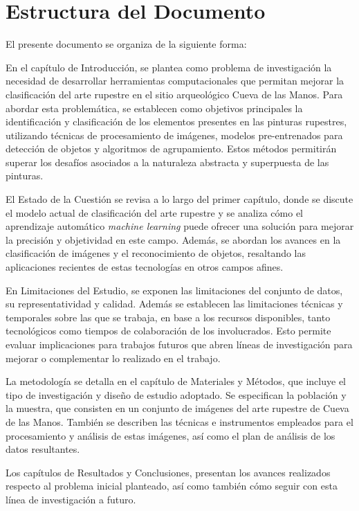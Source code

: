 \section{Estructura del Documento}

El presente documento se organiza de la siguiente forma:

En el capítulo de Introducción, se plantea como problema de investigación la necesidad de desarrollar herramientas computacionales que permitan mejorar la clasificación del arte rupestre en el sitio arqueológico Cueva de las Manos. Para abordar esta problemática, se establecen como objetivos principales la identificación y clasificación de los elementos presentes en las pinturas rupestres, utilizando técnicas de procesamiento de imágenes, modelos pre-entrenados para detección de objetos y algoritmos de agrupamiento. Estos métodos permitirán superar los desafíos asociados a la naturaleza abstracta y superpuesta de las pinturas.

El Estado de la Cuestión se revisa a lo largo del primer capítulo, donde se discute el modelo actual de clasificación del arte rupestre y se analiza cómo el aprendizaje automático \textit{machine learning} puede ofrecer una solución para mejorar la precisión y objetividad en este campo. Además, se abordan los avances en la clasificación de imágenes y el reconocimiento de objetos, resaltando las aplicaciones recientes de estas tecnologías en otros campos afines.

En Limitaciones del Estudio, se exponen las limitaciones del conjunto de datos, su representatividad y calidad. Además se establecen las limitaciones técnicas y temporales sobre las que se trabaja, en base a los recursos disponibles, tanto tecnológicos como tiempos de colaboración de los involucrados. Esto permite evaluar implicaciones para trabajos futuros que abren líneas de investigación para mejorar o complementar lo realizado en el trabajo.

La metodología se detalla en el capítulo de Materiales y Métodos, que incluye el tipo de investigación y diseño de estudio adoptado. Se especifican la población y la muestra, que consisten en un conjunto de imágenes del arte rupestre de Cueva de las Manos. También se describen las técnicas e instrumentos empleados para el procesamiento y análisis de estas imágenes, así como el plan de análisis de los datos resultantes.

Los capítulos de Resultados y Conclusiones, presentan los avances realizados respecto al problema inicial planteado, así como también cómo seguir con esta línea de investigación a futuro.

